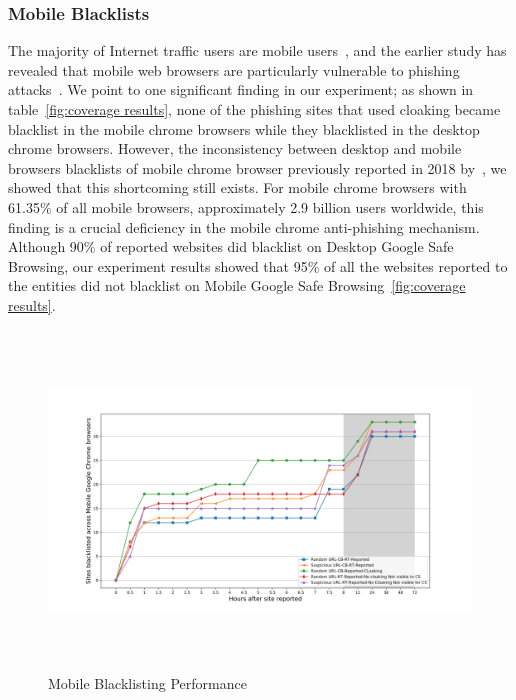 \subsubsection{Mobile Blacklists}
The majority of Internet traffic users are mobile users~\cite{statcounterglobalstats}, and the earlier study has revealed that mobile web browsers are particularly vulnerable to phishing attacks~\cite{luo2017hindsight}.
We point to one significant finding in our experiment; as shown in table~\ref{fig:coverage results}, none of the phishing sites that used cloaking became blacklist in the mobile chrome browsers while they blacklisted in the desktop chrome browsers. However, the inconsistency between desktop and mobile browsers blacklists of mobile chrome browser previously reported in 2018 by~\cite{oest2019phishfarm}, we showed that this shortcoming still exists.
For mobile chrome browsers with 61.35\%  of all mobile browsers, approximately 2.9 billion users worldwide, this finding is a crucial deficiency in the mobile chrome anti-phishing mechanism.
Although 90\%  of reported websites did blacklist on Desktop Google Safe Browsing, our experiment results showed that 95\%  of all the websites reported to the entities did not blacklist on Mobile Google Safe Browsing~\ref{fig:coverage results}.

\begin{figure}[t]
  \includegraphics[width=\textwidth,height=9cm]{figures/Mobile-Blacklists-Speed.png}
  \caption{Mobile Blacklisting Performance }
  \label{Blacklisting speed results}
\end{figure}


